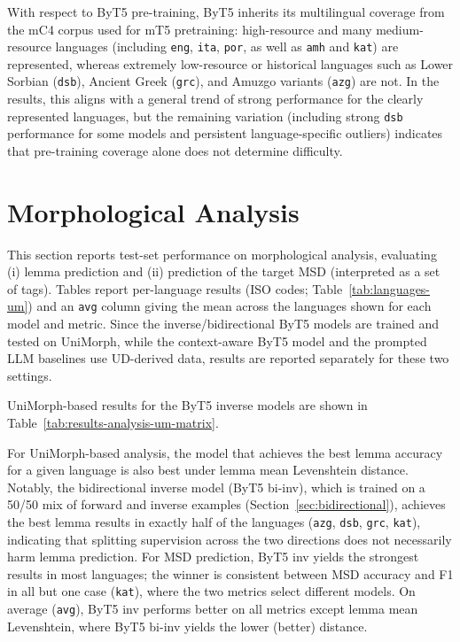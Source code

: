 With respect to ByT5 pre-training, ByT5 inherits its multilingual coverage from the mC4 corpus used for mT5 \parencite{xue-etal-2021-mt5} pretraining: high-resource and many medium-resource languages (including \texttt{eng}, \texttt{ita}, \texttt{por}, as well as \texttt{amh} and \texttt{kat}) are represented, whereas extremely low-resource or historical languages such as Lower Sorbian (\texttt{dsb}), Ancient Greek (\texttt{grc}), and Amuzgo variants (\texttt{azg}) are not.
In the results, this aligns with a general trend of strong performance for the clearly represented languages, but the remaining variation (including strong \texttt{dsb} performance for some models and persistent language-specific outliers) indicates that pre-training coverage alone does not determine difficulty.

\section{Morphological Analysis}

This section reports test-set performance on morphological analysis, evaluating (i) lemma prediction and (ii) prediction of the target \ac{MSD} (interpreted as a set of tags). Tables report per-language results (ISO codes; Table~\ref{tab:languages-um}) and an \texttt{avg} column giving the mean across the languages shown for each model and metric. Since the inverse/bidirectional ByT5 models are trained and tested on UniMorph, while the context-aware ByT5 model and the prompted LLM baselines use UD-derived data, results are reported separately for these two settings.

UniMorph-based results for the ByT5 inverse models are shown in Table~\ref{tab:results-analysis-um-matrix}.


For UniMorph-based analysis, the model that achieves the best lemma accuracy for a given language is also best under lemma mean Levenshtein distance. Notably, the bidirectional inverse model (ByT5 bi-inv), which is trained on a 50/50 mix of forward and inverse examples (Section~\ref{sec:bidirectional}), achieves the best lemma results in exactly half of the languages (\texttt{azg}, \texttt{dsb}, \texttt{grc}, \texttt{kat}), indicating that splitting supervision across the two directions does not necessarily harm lemma prediction. For \ac{MSD} prediction, ByT5 inv yields the strongest results in most languages; the winner is consistent between \ac{MSD} accuracy and F1 in all but one case (\texttt{kat}), where the two metrics select different models. On average (\texttt{avg}), ByT5 inv performs better on all metrics except lemma mean Levenshtein, where ByT5 bi-inv yields the lower (better) distance.


